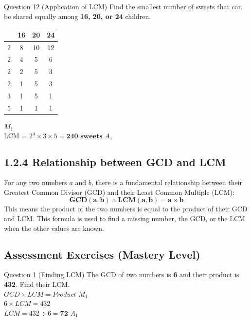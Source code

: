 \documentclass[12pt, a4paper, oneside]{article}
\begin{document}
\begin{solvingbox}{Question 12 (Application of LCM)}
Find the smallest number of sweets that can be shared equally among \textbf{16, 20, or 24} children. \\
\begin{tabular}{|c|c|c|c|} \hline
    & \textbf{16} & \textbf{20} & \textbf{24} \\ \hline
    2 & 8 & 10 & 12 \\ \hline
    2 & 4 & 5 & 6 \\ \hline
    2 & 2 & 5 & 3 \\ \hline
    2 & 1 & 5 & 3 \\ \hline
    3 & 1 & 5 & 1 \\ \hline
    5 & 1 & 1 & 1 \\ \hline
\end{tabular} \hfill $M_1$ \\
LCM = $2^4 \times 3 \times 5 = \mathbf{240\text{ sweets}}$ \hfill $A_1$
\end{solvingbox}

\subsection*{1.2.4 Relationship between GCD and LCM}

\begin{tcolorbox}[colback=lightgrey, colframe=primaryblue, title=\textbf{Concept Summary}, arc=5pt]
    For any two numbers $a$ and $b$, there is a fundamental relationship between their Greatest Common Divisor (GCD) and their Least Common Multiple (LCM):
    $$\mathbf{GCD(a, b) \times LCM(a, b) = a \times b}$$
    This means the product of the two numbers is equal to the product of their GCD and LCM. This formula is used to find a missing number, the GCD, or the LCM when the other values are known.
\end{tcolorbox}

\subsection*{Assessment Exercises (Mastery Level)}

\begin{solvingbox}{Question 1 (Finding LCM)}
The GCD of two numbers is \textbf{6} and their product is \textbf{432}. Find their LCM. \\
$GCD \times LCM = Product$ \hfill $M_1$ \\
$6 \times LCM = 432$ \\
$LCM = 432 \div 6 = \mathbf{72}$ \hfill $A_1$
\end{solvingbox}
\end{document}
